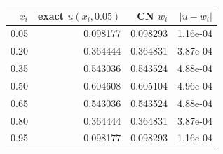 \begin{tabular}{r r r r}\hline
$x_i$ & exact $u(x_i, 0.05)$ & CN $w_i$ & $|u - w_i|$ \\
\hline
0.05 & 0.098177 & 0.098293 & 1.16e-04 \\
0.20 & 0.364444 & 0.364831 & 3.87e-04 \\
0.35 & 0.543036 & 0.543524 & 4.88e-04 \\
0.50 & 0.604608 & 0.605104 & 4.96e-04 \\
0.65 & 0.543036 & 0.543524 & 4.88e-04 \\
0.80 & 0.364444 & 0.364831 & 3.87e-04 \\
0.95 & 0.098177 & 0.098293 & 1.16e-04 \\
\hline
\end{tabular}
